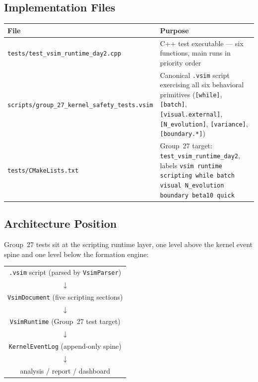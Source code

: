 \documentclass[11pt]{article}
\newcommand{\file}[1]{\texttt{#1}}
\begin{document}
\subsection{Implementation Files}

\begin{center}
\begin{tabular}{@{}lp{9cm}@{}}
\toprule
\textbf{File} & \textbf{Purpose} \\
\midrule
\file{tests/test\_vsim\_runtime\_day2.cpp}
    & C++ test executable — six functions, main runs in priority order \\
\file{scripts/group\_27\_kernel\_safety\_tests.vsim}
    & Canonical \texttt{.vsim} script exercising all six behavioral
      primitives (\texttt{[while]}, \texttt{[batch]},
      \texttt{[visual.external]}, \texttt{[N\_evolution]},
      \texttt{[variance]}, \texttt{[boundary.*]}) \\
\file{tests/CMakeLists.txt}
    & Group~27 target: \texttt{test\_vsim\_runtime\_day2},
      labels \texttt{vsim runtime scripting while batch visual
      N\_evolution boundary beta10 quick} \\
\bottomrule
\end{tabular}
\end{center}

\subsection{Architecture Position}

Group~27 tests sit at the scripting runtime layer, one level above the
kernel event spine and one level below the formation engine:

\begin{center}
\begin{tabular}{c}
\texttt{.vsim} script (parsed by \texttt{VsimParser}) \\
$\downarrow$ \\
\texttt{VsimDocument} (five scripting sections) \\
$\downarrow$ \\
\texttt{VsimRuntime} (Group~27 test target) \\
$\downarrow$ \\
\texttt{KernelEventLog} (append-only spine) \\
$\downarrow$ \\
analysis / report / dashboard
\end{tabular}
\end{center}
\end{document}
